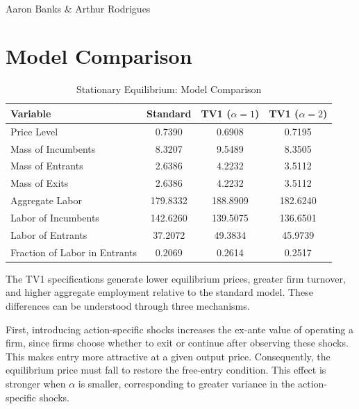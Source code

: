 \documentclass{article}
\begin{document}
    \begin{center}
        \\
        Aaron Banks \& Arthur Rodrigues  
    \end{center}

\section{Model Comparison}

\begin{table}[htbp]
    \centering
    \caption{Stationary Equilibrium: Model Comparison}
    \label{tab:equilibrium_comparison}
    \begin{tabular}{lccc}
        \hline\hline
        Variable & Standard & TV1 ($\alpha=1$) & TV1 ($\alpha=2$) \\
        \hline
        Price Level                  & 0.7390   & 0.6908   & 0.7195   \\
        Mass of Incumbents           & 8.3207   & 9.5489   & 8.3505   \\
        Mass of Entrants             & 2.6386   & 4.2232   & 3.5112   \\
        Mass of Exits                & 2.6386   & 4.2232   & 3.5112   \\
        \hline
        Aggregate Labor              & 179.8332 & 188.8909 & 182.6240 \\
        \quad Labor of Incumbents    & 142.6260 & 139.5075 & 136.6501 \\
        \quad Labor of Entrants      & 37.2072  & 49.3834  & 45.9739  \\
        Fraction of Labor in Entrants & 0.2069  & 0.2614   & 0.2517   \\
        \hline\hline
    \end{tabular}
\end{table}

The TV1 specifications generate lower equilibrium prices, greater firm turnover,
and higher aggregate employment relative to the standard model. These
differences can be understood through three mechanisms.

First, introducing action-specific shocks increases the ex-ante value of
operating a firm, since firms choose whether to exit or continue after
observing these shocks. This makes entry more attractive at a given output
price. Consequently, the equilibrium price must fall to restore the
free-entry condition. This effect is stronger when $\alpha$ is smaller,
corresponding to greater variance in the action-specific shocks.
\end{document}
